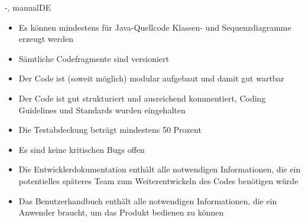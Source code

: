 \documentclass[twoside]{report}
\begin{document}
\begin{shownto}{-, manualDE}


\begin{itemize}
\item{Es können mindestens für Java-Quellcode Klassen- und Sequenzdiagramme erzeugt werden}
\item{Sämtliche Codefragmente sind versioniert}
\item{Der Code ist (soweit möglich) modular aufgebaut und damit gut wartbar}
\item{Der Code ist gut strukturiert und ausreichend kommentiert, Coding Guidelines und Standards wurden eingehalten}
\item{Die Testabdeckung beträgt mindestens 50 Prozent}
\item{Es sind keine kritischen Bugs offen}
\item{Die Entwicklerdokumentation enthält alle notwendigen Informationen, die ein potentielles späteres Team zum Weiterentwickeln des Codes benötigen würde}
\item{Das Benutzerhandbuch enthält alle notwendigen Informationen, die ein Anwender braucht, um das Produkt bedienen zu können}
\end{itemize}
\nsecend


\end{shownto}
\end{document}
